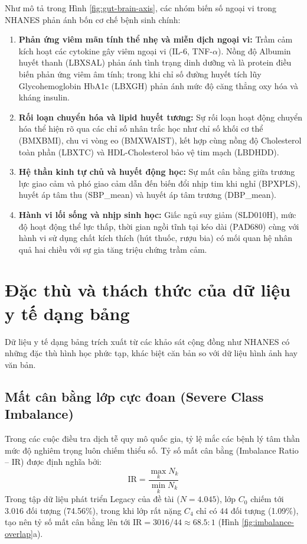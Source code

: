 Như mô tả trong Hình \ref{fig:gut-brain-axis}, các nhóm biến số ngoại vi trong NHANES phản ánh bốn cơ chế bệnh sinh chính:
\begin{enumerate}
    \item \textbf{Phản ứng viêm mãn tính thể nhẹ và miễn dịch ngoại vi:} Trầm cảm kích hoạt các cytokine gây viêm ngoại vi (IL-6, TNF-$\alpha$). Nồng độ Albumin huyết thanh (LBXSAL) phản ánh tình trạng dinh dưỡng và là protein điều biến phản ứng viêm âm tính; trong khi chỉ số đường huyết tích lũy Glycohemoglobin HbA1c (LBXGH) phản ánh mức độ căng thẳng oxy hóa và kháng insulin.
    \item \textbf{Rối loạn chuyển hóa và lipid huyết tương:} Sự rối loạn hoạt động chuyển hóa thể hiện rõ qua các chỉ số nhân trắc học như chỉ số khối cơ thể (BMXBMI), chu vi vòng eo (BMXWAIST), kết hợp cùng nồng độ Cholesterol toàn phần (LBXTC) và HDL-Cholesterol bảo vệ tim mạch (LBDHDD).
    \item \textbf{Hệ thần kinh tự chủ và huyết động học:} Sự mất cân bằng giữa trương lực giao cảm và phó giao cảm dẫn đến biến đổi nhịp tim khi nghỉ (BPXPLS), huyết áp tâm thu (SBP\_mean) và huyết áp tâm trương (DBP\_mean).
    \item \textbf{Hành vi lối sống và nhịp sinh học:} Giấc ngủ suy giảm (SLD010H), mức độ hoạt động thể lực thấp, thời gian ngồi tĩnh tại kéo dài (PAD680) cùng với hành vi sử dụng chất kích thích (hút thuốc, rượu bia) có mối quan hệ nhân quả hai chiều với sự gia tăng triệu chứng trầm cảm.
\end{enumerate}

\section{Đặc thù và thách thức của dữ liệu y tế dạng bảng}
\label{sec:dac-thu-du-lieu-bang}

Dữ liệu y tế dạng bảng trích xuất từ các khảo sát cộng đồng như NHANES có những đặc thù hình học phức tạp, khác biệt căn bản so với dữ liệu hình ảnh hay văn bản.

\subsection{Mất cân bằng lớp cực đoan (Severe Class Imbalance)}
\label{subsec:mat-can-bang-lop}

Trong các cuộc điều tra dịch tễ quy mô quốc gia, tỷ lệ mắc các bệnh lý tâm thần mức độ nghiêm trọng luôn chiếm thiểu số. Tỷ số mất cân bằng (Imbalance Ratio -- IR) được định nghĩa bởi:
\begin{equation}
    \text{IR} = \frac{\max_k N_k}{\min_k N_k}
\end{equation}
Trong tập dữ liệu phát triển Legacy của đề tài ($N = 4.045$), lớp $C_0$ chiếm tới $3.016$ đối tượng (74.56\%), trong khi lớp rất nặng $C_4$ chỉ có $44$ đối tượng (1.09\%), tạo nên tỷ số mất cân bằng lên tới $\text{IR} = 3016 / 44 \approx 68.5:1$ (Hình \ref{fig:imbalance-overlap}a).

